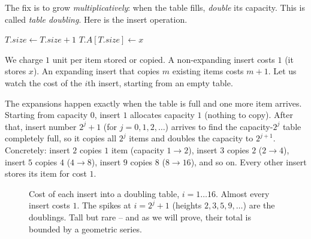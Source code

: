 The fix is to grow \emph{multiplicatively}: when the table fills, \emph{double} its
capacity. This is called \emph{table doubling}. Here is the insert operation.

\begin{algorithm}[H]
\caption{\textsc{Table-Insert}($T, x$)}
$T.\mathit{size} \leftarrow T.\mathit{size} + 1$\;
$T.A[T.\mathit{size}] \leftarrow x$ 
\end{algorithm}

We charge $1$ unit per item stored or copied. A non-expanding insert costs $1$ (it
stores $x$). An expanding insert that copies $m$ existing items costs
$m + 1$. Let us watch the cost of the $i$th insert, starting from an empty table.

The expansions happen exactly when the table is full and one more item arrives.
Starting from capacity $0$, insert $1$ allocates capacity $1$ (nothing to copy).
After that, insert number $2^j + 1$ (for $j = 0, 1, 2, \ldots$) arrives to find
the capacity-$2^j$ table completely full, so it copies all $2^j$ items and doubles
the capacity to $2^{j+1}$. Concretely: insert $2$ copies $1$ item (capacity
$1 \to 2$), insert $3$ copies $2$ ($2 \to 4$), insert $5$ copies $4$ ($4 \to 8$),
insert $9$ copies $8$ ($8 \to 16$), and so on. Every other insert stores its
item for cost $1$.

\begin{figure}[h]
\centering
{}
\caption{Cost of each insert into a doubling table, $i = 1 \ldots 16$. Almost
every insert costs $1$. The spikes at $i = 2^j + 1$ (heights $2,3,5,9,\ldots$) are
the doublings. Tall but rare -- and as we will prove, their total is bounded by a
geometric series.}
\label{ch17:doubling-spikes}
\end{figure}

